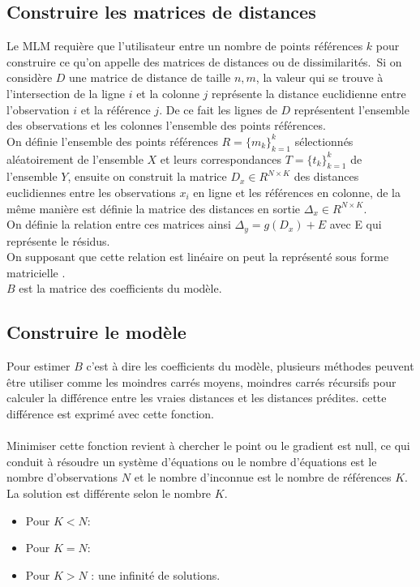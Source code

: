 \documentclass[12pt,a4paper]{report}
\begin{document}
\subsection{Construire les matrices de distances}
\par Le MLM requière que l'utilisateur entre un nombre de points références $k$ pour construire ce qu'on appelle des matrices de distances ou de dissimilarités.\
Si on considère $D$ une matrice de distance de taille $n,m$, la valeur qui se trouve à l'intersection de la ligne $i$ et la colonne $j$ représente la distance euclidienne entre l'observation $i$ et la référence $j$. De ce fait les lignes de $D$ représentent l'ensemble des observations et les colonnes l'ensemble des points références.\\
On définie l'ensemble des points références $R=\{m_k\}_{k=1}^k$ sélectionnés aléatoirement de l'ensemble $X$ et leurs correspondances $T =\{t_k\}_{k=1}^k$ de l'ensemble $Y$, ensuite on construit la matrice $D_x \in R^{N \times K}$ des distances euclidiennes entre les observations $x_i$ en ligne et les références  en colonne, de la même manière est définie la matrice des distances en sortie $\Delta_x \in R^{N \times K}$.\\
On définie la relation entre  ces matrices ainsi $\Delta_y = g(D_x) + E$ avec E qui représente le résidus.\\
On supposant que cette relation est linéaire on peut la représenté sous forme matricielle .\\$B$ est la matrice des coefficients du modèle.\\
\subsection{Construire le modèle}
\par Pour estimer $B$ c'est à dire les coefficients du modèle, plusieurs méthodes peuvent être utiliser comme les moindres carrés moyens, moindres carrés récursifs pour calculer la différence entre les vraies distances et les distances prédites. cette différence est exprimé avec cette fonction.\\ \\
Minimiser cette fonction revient à chercher le point ou le gradient est null, ce qui conduit à résoudre un système d'équations ou le nombre d'équations est le nombre d'observations $N$ et le nombre d'inconnue est le nombre de références $K$. La solution est différente selon le nombre $K$.\\
\begin{itemize}
\item Pour $K < N$: 
\item Pour $K = N$: \boldmath{$\hat{B} = {D_x}^{-1} \Delta_y$}
\item Pour $K > N$ : une infinité de solutions.
\end{itemize}
\end{document}

